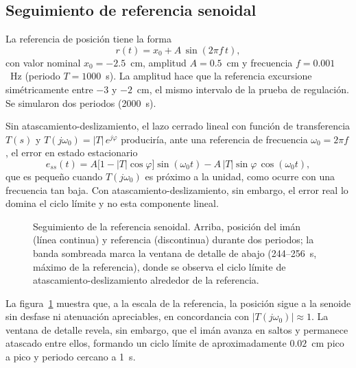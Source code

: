 \subsection{Seguimiento de referencia senoidal}

La referencia de posición tiene la forma
\begin{equation}
  r(t) = x_0 + A\,\sin(2\pi f\, t) ,
  \label{eq:ref_senoidal}
\end{equation}
con valor nominal $x_0 = -2.5$~cm, amplitud $A = 0.5$~cm y frecuencia $f = 0.001$~Hz (periodo $T = 1000$~s). La amplitud hace que la referencia excursione simétricamente entre $-3$ y $-2$~cm, el mismo intervalo de la prueba de regulación. Se simularon dos periodos (2000~s).

Sin atascamiento-deslizamiento, el lazo cerrado lineal con función de transferencia $T(s)$ y $T(j\omega_0)=|T|\,e^{j\varphi}$ produciría, ante una referencia de frecuencia $\omega_0 = 2\pi f$, el error en estado estacionario
\begin{equation}
  e_{ss}(t) = A\bigl[1 - |T|\cos\varphi\bigr]\sin(\omega_0 t)
              - A\,|T|\sin\varphi\,\cos(\omega_0 t) ,
  \label{eq:ess_senoidal}
\end{equation}
que es pequeño cuando $T(j\omega_0)$ es próximo a la unidad, como ocurre con una frecuencia tan baja. Con atascamiento-deslizamiento, sin embargo, el error real lo domina el ciclo límite y no esta componente lineal.

\begin{figure}[ht]
    \centering
    
    \caption[Seguimiento senoidal: posición]{Seguimiento de la referencia senoidal. Arriba, posición del imán (línea continua) y referencia (discontinua) durante dos periodos; la banda sombreada marca la ventana de detalle de abajo (244--256~s, máximo de la referencia), donde se observa el ciclo límite de atascamiento-deslizamiento alrededor de la referencia.}
    \label{fig:sen_pos}
\end{figure}

La figura~\ref{fig:sen_pos} muestra que, a la escala de la referencia, la posición sigue a la senoide sin desfase ni atenuación apreciables, en concordancia con $|T(j\omega_0)|\approx 1$. La ventana de detalle revela, sin embargo, que el imán avanza en saltos y permanece atascado entre ellos, formando un ciclo límite de aproximadamente $0.02$~cm pico a pico y periodo cercano a 1~s.

\FloatBarrier

